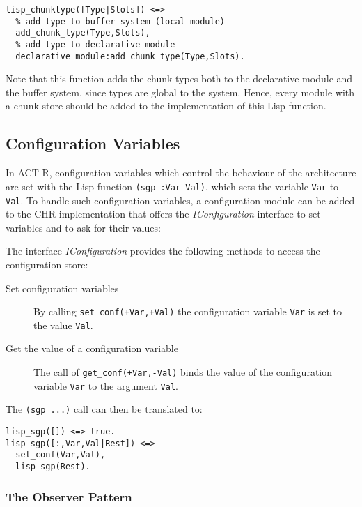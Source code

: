 \begin{lstlisting}
lisp_chunktype([Type|Slots]) <=>
  % add type to buffer system (local module)
  add_chunk_type(Type,Slots),
  % add type to declarative module
  declarative_module:add_chunk_type(Type,Slots).
\end{lstlisting}

Note that this function adds the chunk-types both to the declarative module and the buffer system, since types are global to the system. Hence, every module with a chunk store should be added to the implementation of this Lisp function.

\subsection{Configuration Variables}
\label{configuration}

In ACT-R, configuration variables which control the behaviour of the architecture are set with the Lisp function \lstinline|(sgp :Var Val)|, which sets the variable \lstinline|Var| to \lstinline|Val|. To handle such configuration variables, a configuration module can be added to the CHR implementation that offers the \emph{IConfiguration} interface to set variables and to ask for their values:

\begin{definition}[IConfiguration]
\label{def:iconfiguration}
The interface \emph{IConfiguration} provides the following methods to access the configuration store:
\begin{description}
 \item[Set configuration variables] By calling \lstinline|set_conf(+Var,+Val)| the configuration variable \lstinline|Var| is set to the value \lstinline|Val|.
 \item[Get the value of a configuration variable] The call of \lstinline|get_conf(+Var,-Val)| binds the value of the configuration variable \lstinline|Var| to the argument \lstinline|Val|.
\end{description}
\end{definition}

The \lstinline|(sgp ...)| call can then be translated to:

\begin{lstlisting}
lisp_sgp([]) <=> true.
lisp_sgp([:,Var,Val|Rest]) <=>
  set_conf(Var,Val),
  lisp_sgp(Rest).
\end{lstlisting}

\subsubsection{The Observer Pattern}

